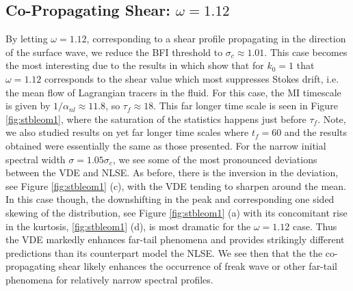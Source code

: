 \documentclass[a4paper,11pt]{article}
\begin{document}
\subsection*{Co-Propagating Shear: $\omega = 1.12$}

By letting $\omega=1.12$, corresponding to a shear profile propagating in the direction of the surface wave, we reduce the BFI threshold to $\sigma_{c} \approx 1.01$.  This case becomes the most interesting due to the results in \cite{curtis8} which show that for $k_{0}=1$ that $\omega=1.12$ corresponds to the shear value which most suppresses Stokes drift, i.e. the mean flow of Lagrangian tracers in the fluid.  For this case, the MI timescale is given by $1/\alpha_{nl}\approx 11.8$, so $\tau_{f}\approx 18$.  This far longer time scale is seen in Figure \ref{fig:stbleom1}, where the saturation of the statistics happens just before $\tau_{f}$.  Note, we also studied results on yet far longer time scales where $t_{f}=60$ and the results obtained were essentially the same as those presented.  For the narrow initial spectral width $\sigma = 1.05\sigma_{c}$, we see some of the most pronounced deviations between the VDE and NLSE.  As before, there is the inversion in the deviation, see Figure \ref{fig:stbleom1} (c), with the VDE tending to sharpen around the mean.  In this case though, the downshifting in the peak and corresponding one sided skewing of the distribution, see Figure \ref{fig:stbleom1} (a) with its concomitant rise in the kurtosis, \ref{fig:stbleom1} (d), is most dramatic for the $\omega=1.12$ case.  Thus the VDE markedly enhances far-tail phenomena and provides strikingly different predictions than its counterpart model the NLSE.  We see then that the the co-propagating shear likely enhances the occurrence of freak wave or other far-tail phenomena for relatively narrow spectral profiles.  
\end{document}
